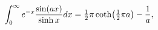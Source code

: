 \[\int_{0}^{\infty}e^{-x}\frac{\mathop{\sin\/}\nolimits\!\left(ax\right)}{%
\mathop{\sinh\/}\nolimits x}dx=\tfrac{1}{2}\pi\mathop{\coth\/}\nolimits\!\left%
(\tfrac{1}{2}\pi a\right)-\frac{1}{a},\]